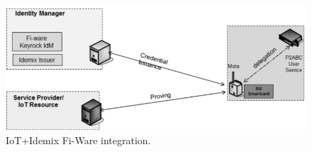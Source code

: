 \begin{figure}[bth]
	\begin{center}
		\includegraphics[width=0.8\linewidth]{gfx/fiware}
		\caption{IoT+Idemix Fi-Ware integration.}
	\end{center}
	\label{fig:fiware}
\end{figure}